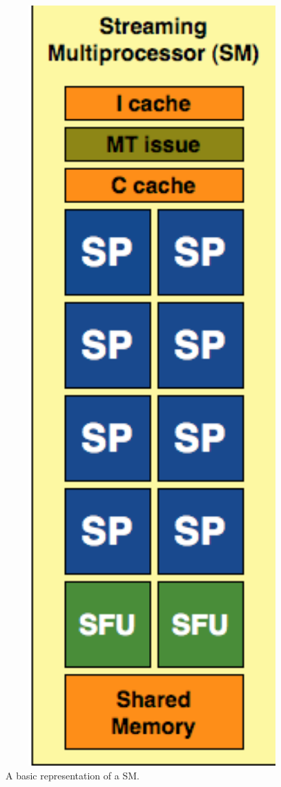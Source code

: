 \begin{figure}[h!]
\centering
 \includegraphics[width=1\textwidth]{figures/SM.PNG} %
\caption{A basic representation of a SM.}\label{image:SM} 
\end{figure}
